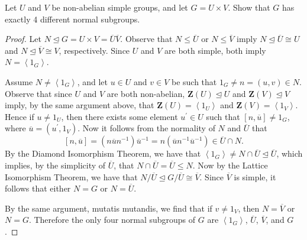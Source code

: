 \documentclass[10pt]{amsart}
\newcommand{\cntr}[1]{\mathbf{Z}\left(#1\right)}
\begin{document}
\begin{thm}
  Let $U$ and $V$ be non-abelian simple groups, and let $G = U \times V$.
  Show that $G$ has exactly 4 different normal subgroups.
  \begin{proof}
    Let $N \unlhd G = U \times V = \overline{U}\overline{V}$.
    Observe that $N \leq \overline{U}$ or $N \leq \overline{V}$ imply $N \unlhd \overline{U} \cong U$ and $N \unlhd \overline{V} \cong V$, respectively.
    Since $U$ and $V$ are both simple, both imply $N = \left< 1_G \right>$.

    Assume $N \not = \left< 1_G \right>$, and let $u \in U$ and $v \in V$ be such that $1_G \not = n = (u,v) \in N$.
    Observe that since $U$ and $V$ are both non-abelian, $\cntr{U} \unlhd U$ and $\cntr{V} \unlhd V$ imply, by the same argument above, that $\cntr{U} = \left< 1_U \right>$ and $\cntr{V} = \left< 1_V \right>$.
    Hence if $u \not = 1_U$, then there exists some element $u^\prime \in U$ such that $[n,\overline{u}] \not = 1_G$, where $\overline{u} = (u^\prime, 1_V)$.
    Now it follows from the normality of $N$ and $\overline{U}$ that $$[n,\overline{u}] = (n\overline{u}n^{-1})\overline{u}^{-1} = n(\overline{u}n^{-1}\overline{u}^{-1}) \in \overline{U} \cap N.$$
    By the Diamond Isomorphism Theorem, we have that $\left<1_G\right> \not = N \cap \overline{U} \unlhd \overline{U}$, which implies, by the simplicity of $\overline{U}$, that $N \cap \overline{U} = \overline{U} \leq N$.
    Now by the Lattice Isomorphism Theorem, we have that $N/\overline{U} \unlhd G/\overline{U} \cong \overline{V}$.
    Since $\overline V$ is simple, it follows that either $N = G$ or $N = \overline{U}$.
    
    By the same argument, mutatis mutandis, we find that if $v \not = 1_V$, then $N = \overline{V}$ or $N = G$.
    Therefore the only four normal subgroups of $G$ are $\left<1_G\right>$, $\overline{U}$, $\overline{V}$, and $G$.
  \end{proof}
\end{thm}
\end{document}
